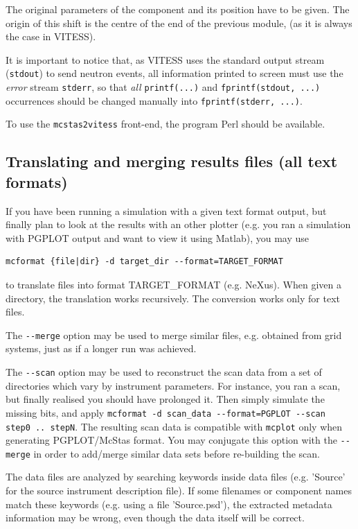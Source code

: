 The original parameters of the component and its position have to be given. The
origin of this shift is the centre of the end of the previous module, (as it is
always the case in VITESS).

It is important to notice that, as VITESS uses the standard output stream
(\verb+stdout+) to send neutron events, all information printed to screen must
use the \emph{error} stream \verb+stderr+, so that \emph{all} \verb+printf(...)+
and \verb+fprintf(stdout, ...)+ occurrences should be changed manually into
\verb+fprintf(stderr, ...)+.

To use the \verb+mcstas2vitess+ front-end, the program Perl should be available.

\subsection{Translating and merging \MCS results files (all text formats)}
\label{s:mcformat}
 
 

If you have been running a \MCS simulation with a given text format output, but
finally plan to look at the results with an other plotter (e.g. you ran a
simulation with PGPLOT output and want to view it using Matlab), you may use
\begin{lstlisting}
mcformat {file|dir} -d target_dir --format=TARGET_FORMAT
\end{lstlisting}
to translate files into format TARGET\_FORMAT (e.g. NeXus). When given a directory, the
translation works recursively. The conversion works only for text files.

The \verb+--merge+ option may be used to merge similar files, e.g. obtained from
grid systems, just as if a longer run was achieved.

The \verb+--scan+ option may be used to reconstruct the scan data from a set of
directories which vary by instrument parameters. For instance, you ran a scan,
but finally realised you should have prolonged it. Then simply simulate the
missing bits, and apply
\verb+mcformat -d scan_data --format=PGPLOT --scan step0 .. stepN+. The
resulting scan data is compatible with \verb+mcplot+ only when generating
PGPLOT/McStas format. You may conjugate this option with the
\verb+--merge+ in order to add/merge similar data sets before re-building the
scan.

The data files are analyzed by searching keywords inside data files
(e.g. 'Source' for the source instrument description file). If some filenames or
component names match these keywords (e.g. using a file 'Source.psd'), the
extracted metadata information may be wrong, even though the data itself will be
correct.

